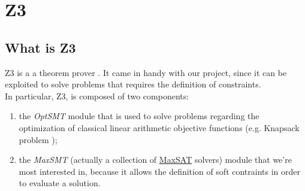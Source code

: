 \section{Z3}\label{Z3}
\subsection{What is Z3}
Z3 is a a theorem prover \cite{z3}. It came in handy with our project, since it can be exploited to solve problems that requires the definition of constraints.\\
In particular, Z3, is composed of two components:
\begin{enumerate}
  \item the \textit{OptSMT} module that is used to solve problems regarding the optimization of classical linear arithmetic objective functions (e.g. Knapsack problem \cite{knapsack});
  \item the \textit{MaxSMT} (actually a collection of \underline{MaxSAT} solvers) module that we're most interested in, because it allows the definition of soft contraints in order to evaluate a solution.
\end{enumerate}


